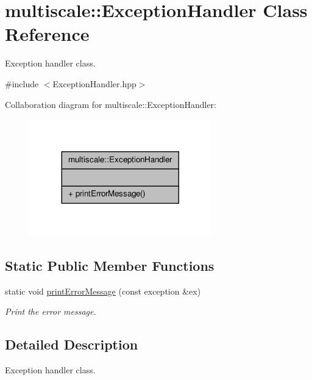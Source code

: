 \hypertarget{classmultiscale_1_1ExceptionHandler}{\section{multiscale\-:\-:Exception\-Handler Class Reference}
\label{classmultiscale_1_1ExceptionHandler}
}


Exception handler class.  




{\ttfamily \#include $<$Exception\-Handler.\-hpp$>$}



Collaboration diagram for multiscale\-:\-:Exception\-Handler\-:\nopagebreak
\begin{figure}[H]
\begin{center}
\leavevmode
\includegraphics[width=224pt]{classmultiscale_1_1ExceptionHandler__coll__graph}
\end{center}
\end{figure}
\subsection*{Static Public Member Functions}
\begin{DoxyCompactItemize}
\item 
static void \hyperlink{classmultiscale_1_1ExceptionHandler_ac57f49fa242649f17c86409f37629455}{print\-Error\-Message} (const exception \&ex)
\begin{DoxyCompactList}\small\item\em Print the error message. \end{DoxyCompactList}\end{DoxyCompactItemize}


\subsection{Detailed Description}
Exception handler class. 

